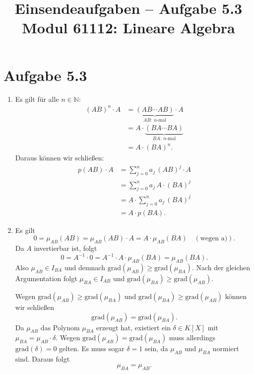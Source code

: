 \documentclass[a4paper,12pt]{article}
\title{Einsendeaufgaben -- Aufgabe 5.3\\[0.5em]
\large Modul 61112: Lineare Algebra}
\author{}
\date{}
\begin{document}
\maketitle

\section*{Aufgabe 5.3}

\begin{enumerate}[label=\alph*)]
  \item Es gilt für alle $n \in \mathbb{N}$:
  \begin{align*}
    (AB)^n \cdot A
      &= \underbrace{(AB \cdots AB)}_{AB:\ n\text{-mal}} \cdot A \\
      &= A \cdot \underbrace{(BA \cdots BA)}_{BA:\ n\text{-mal}} \\
      &= A \cdot (BA)^n.
  \end{align*}
  Daraus können wir schließen:
  \begin{align*}
    p(AB) \cdot A
      &= \sum_{j=0}^{n} a_j \, (AB)^j \cdot A \\
      &= \sum_{j=0}^{n} a_j \, A \cdot (BA)^j \\
      &= A \cdot \sum_{j=0}^{n} a_j \, (BA)^j \\
      &= A \cdot p(BA).
  \end{align*}

  \item Es gilt
  \[
    0 = \mu_{AB}(AB) = \mu_{AB}(AB) \cdot A = A \cdot \mu_{AB}(BA) \quad (\text{wegen a)}).
  \]
  Da $A$ invertierbar ist, folgt
  \[
    0 = A^{-1} \cdot 0 = A^{-1} \cdot A \cdot \mu_{AB}(BA) = \mu_{AB}(BA).
  \]
  Also $\mu_{AB} \in I_{BA}$ und demnach $\mathrm{grad}(\mu_{AB}) \geq \mathrm{grad}(\mu_{BA})$.
  Nach der gleichen Argumentation folgt $\mu_{BA} \in I_{AB}$ und $\mathrm{grad}(\mu_{BA}) \geq \mathrm{grad}(\mu_{AB})$.

  Wegen $\mathrm{grad}(\mu_{AB}) \geq \mathrm{grad}(\mu_{BA})$ und $\mathrm{grad}(\mu_{BA}) \geq \mathrm{grad}(\mu_{AB})$ können wir schließen
  \[
    \mathrm{grad}(\mu_{AB}) = \mathrm{grad}(\mu_{BA}).
  \]
  Da $\mu_{AB}$ das Polynom $\mu_{BA}$ erzeugt hat, existiert ein $\delta \in K[X]$ mit $\mu_{BA} = \mu_{AB} \cdot \delta$.
  Wegen $\mathrm{grad}(\mu_{AB}) = \mathrm{grad}(\mu_{BA})$ muss allerdings $\mathrm{grad}(\delta) = 0$ gelten.
  Es muss sogar $\delta = 1$ sein, da $\mu_{AB}$ und $\mu_{BA}$ normiert sind. Daraus folgt
  \[
    \mu_{BA} = \mu_{AB}.
  \]
\end{enumerate}
\end{document}
